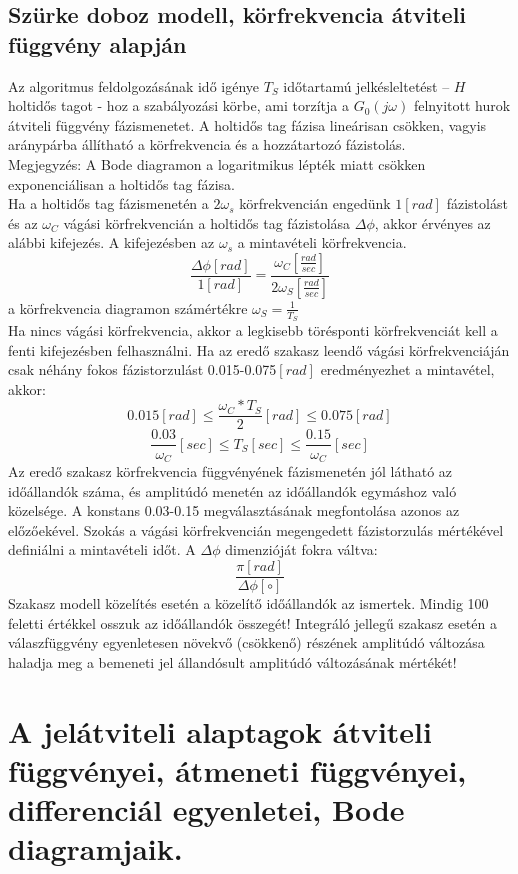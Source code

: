 \documentclass[11pt,a4paper]{article}
\begin{document}
\subsection{Szürke doboz modell, körfrekvencia átviteli függvény alapján}
Az algoritmus feldolgozásának idő igénye $T_S$ időtartamú jelkésleltetést – $H$
holtidős tagot - hoz a szabályozási körbe, ami torzítja a $G_0\left(j\omega\right)$ felnyitott hurok átviteli
függvény fázismenetet. A holtidős tag fázisa lineárisan csökken, vagyis aránypárba állítható
a körfrekvencia és a hozzátartozó fázistolás.\\
Megjegyzés: A Bode diagramon a logaritmikus lépték miatt csökken exponenciálisan
a holtidős tag fázisa.\\
Ha a holtidős tag fázismenetén a $2\omega_{s}$ körfrekvencián engedünk $1\left[rad\right]$ fázistolást és az $\omega_C$ vágási körfrekvencián a holtidős tag fázistolása $\Delta \phi$, akkor érvényes az
alábbi kifejezés. A kifejezésben az $\omega_{s}$ a mintavételi körfrekvencia.
$$\frac{\Delta \phi\left[rad\right]}{1\left[rad\right]} = \frac{\omega_C \left[\frac{rad}{sec}\right]}{2\omega_S \left[\frac{rad}{sec}\right]}$$
a körfrekvencia diagramon számértékre $\omega_S = \frac{1}{T_S}$\\
Ha nincs vágási körfrekvencia, akkor a legkisebb törésponti körfrekvenciát kell
a fenti kifejezésben felhasználni.
Ha az eredő szakasz leendő vágási körfrekvenciáján csak néhány fokos fázistorzulást {0.015-0.075$\left[rad\right]$} eredményezhet a mintavétel, akkor:
$$0.015\left[rad\right]\leq \frac{\omega_C * T_S}{2}\left[rad\right]\leq0.075\left[rad\right]$$
$$\frac{0.03}{\omega_C}\left[sec\right] \leq T_S \left[sec\right] \leq \frac{0.15}{\omega_C} \left[sec\right]$$
Az eredő szakasz körfrekvencia függvényének fázismenetén jól látható az időállandók
száma, és amplitúdó menetén az időállandók egymáshoz való közelsége. A
konstans {0.03-0.15} megválasztásának megfontolása azonos az előzőekével.
Szokás a vágási körfrekvencián megengedett fázistorzulás mértékével definiálni
a mintavételi időt. A $\Delta \phi$ dimenzióját fokra váltva:
$$\frac{\pi \left[rad\right]}{\Delta \phi \left[\circ\right]}$$
Szakasz modell közelítés esetén a közelítő időállandók az ismertek. Mindig 100 feletti értékkel osszuk az időállandók összegét! Integráló jellegű szakasz esetén a válaszfüggvény egyenletesen növekvő (csökkenő) részének amplitúdó változása haladja meg a bemeneti jel állandósult amplitúdó változásának mértékét! 
\section{A jelátviteli alaptagok átviteli függvényei, átmeneti függvényei, differenciál egyenletei, Bode diagramjaik.}
\end{document}
